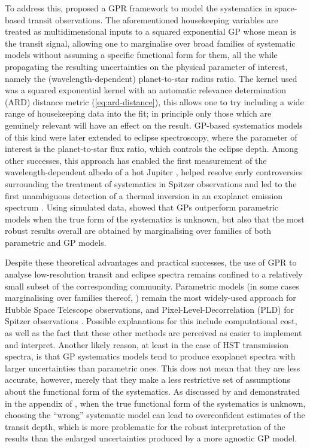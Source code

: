 \documentclass[letterpaper]{ar-1col}
\begin{document}
To address this, \citet{2012MNRAS.419.2683G} proposed a GPR framework to model the systematics in space-based transit observations. The aforementioned housekeeping variables are treated as multidimensional inputs to a squared exponential GP whose mean is the transit signal, allowing one to marginalise over broad families of systematic models without assuming a specific functional form for them, all the while propagating the resulting uncertainties on the physical parameter of interest, namely the (wavelength-dependent) planet-to-star radius ratio. The kernel used was a squared exponential kernel with an automatic relevance determination (ARD) distance metric (\autoref{eq:ard-distance}), this allows one to try including a wide range of housekeeping data into the fit; in principle only those which are genuinely relevant will have an effect on the result.
GP-based systematics models of this kind were later extended to eclipse spectroscopy, where the parameter of interest is the planet-to-star flux ratio, which controls the eclipse depth. Among other successes, this approach has enabled the first measurement of the wavelength-dependent albedo of a hot Jupiter \citep{2013ApJ...772L..16E}, helped resolve early controversies surrounding the treatment of systematics in Spitzer observations \citep{2015MNRAS.451..680E} and
led to the first unambiguous detection of a thermal inversion in an exoplanet emission spectrum \citep{2017Natur.548...58E}. Using simulated data, \citet{2014MNRAS.445.3401G} showed that GPs outperform parametric models when the true form of the systematics is unknown, but also that the most robust results overall are obtained by marginalising over families of both parametric and GP models.

Despite these theoretical advantages and practical successes, the use of GPR to analyse low-resolution transit and eclipse spectra remains confined to a relatively small subset of the corresponding community. Parametric models (in some cases marginalising over families thereof, \citealt{2016ApJ...819...10W}) remain the most widely-used approach for Hubble Space Telescope observations, and Pixel-Level-Decorrelation (PLD) for Spitzer observations \citep{2015ApJ...805..132D}. Possible explanations for this include computational cost, as well as the fact that these other methods are perceived as easier to implement and interpret. Another likely reason, at least in the case of HST transmission spectra, is that GP systematics models tend to produce exoplanet spectra with larger uncertainties than parametric ones. This does not mean that they are less accurate, however, merely that they make a less restrictive set of assumptions about the functional form of the systematics. As discussed by \citet{2014MNRAS.445.3401G} and demonstrated in the appendix of \citet{2018AJ....156..283E}, when the true functional form of the systematics is unknown, choosing the ``wrong'' systematic model can lead to overconfident estimates of the transit depth, which is more problematic for the robust interpretation of the results than the enlarged uncertainties produced by a more agnostic GP model.
\end{document}
